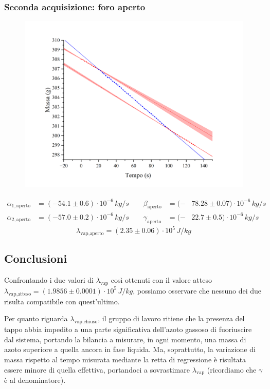 \documentclass{article}
\begin{document}
\subsubsection{Seconda acquisizione: foro aperto}
\begin{figure}[H]
  \includegraphics[trim={2.5cm 0.6cm 3cm 1cm},clip,width=\textwidth]{img/g_azoto3.png}
\end{figure}
\[\begin{aligned}
  \alpha_{1,\text{aperto}} &= (-54.1\pm0.6)\cdot10^{-6}\,\unit{kg\per s}
  \qquad
  \beta_{\text{aperto}}\!\!\!\!&=(-&78.28\pm0.07)\cdot10^{-6}\,\unit{kg\per s}
  \\
  \alpha_{2,\text{aperto}} &= (-57.0\pm0.2)\cdot10^{-6}\,\unit{kg\per s}
  \qquad
  \gamma_\text{aperto}\!\!\!\!&=(-&22.7\pm0.5)\cdot10^{-6}\,\unit{kg\per s}
\end{aligned}\]
\[
  \lambda_\text{vap,aperto} = (2.35\pm0.06)\cdot10^5\,\unit{J \per kg}
\]

\subsection{Conclusioni}
Confrontando i due valori di $\lambda_\text{vap}$ così ottenuti
con il valore atteso $\lambda_\text{vap,atteso} =
(1.9856\pm0.0001)\cdot10^5\,\unit{J\per kg}$,
possiamo osservare che nessuno dei due risulta compatibile con
quest'ultimo.

\vspace{2mm}
Per quanto riguarda $\lambda_\text{vap,chiuso}$, il gruppo di
lavoro ritiene che la presenza del tappo abbia impedito a una
parte significativa dell'azoto gassoso di fuoriuscire dal sistema,
portando la bilancia a misurare, in ogni momento, una massa di
azoto superiore a quella ancora in fase liquida. Ma, soprattutto,
la variazione di massa rispetto al tempo misurata mediante la
retta di regressione è risultata essere minore di quella effettiva,
portandoci a sovrastimare $\lambda_\text{vap}$ (ricordiamo che
$\gamma$ è al denominatore).
\end{document}
